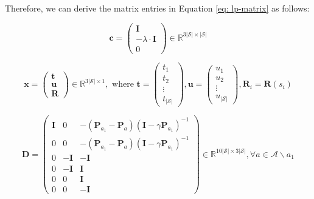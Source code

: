 Therefore, we can derive the matrix entries in Equation \ref{eq: lp-matrix} as follows:

\begin{equation}
\label{eq: c}
    \mathbf{c}=\left(\begin{array}{c}\mathbf{I} \\ -\lambda \cdot \mathbf{I} \\ 0\end{array}\right) \in \mathbb{R}^{3|\mathcal{S}| \times|\mathcal{S}|}
\end{equation}

\begin{equation}
\label{eq: x}
    \mathbf{x}=\left(\begin{array}{c}\mathbf{t} \\ \mathbf{u} \\ \mathbf{R}\end{array}\right) \in \mathbb{R}^{3|\mathcal{S}| \times 1}, \text { where } \mathbf{t}=\left(\begin{array}{c}t_{1} \\ t_{2} \\ \vdots \\ t_{|\mathcal{S}|}\end{array}\right), \mathbf{u}=\left(\begin{array}{c}u_{1} \\ u_{2} \\ \vdots \\ u_{|\mathcal{S}|}\end{array}\right), \mathbf{R}_{i}=\mathbf{R}\left(s_{i}\right)
\end{equation}

\begin{equation}
\label{eq: d}
    \mathbf{D}=\left(\begin{array}{ccc}\mathbf{I} & 0 & -\left(\mathbf{P}_{a_{1}}-\mathbf{P}_{a}\right)\left(\mathbf{I}-\gamma \mathbf{P}_{a_{1}}\right)^{-1} \\ 0 & 0 & -\left(\mathbf{P}_{a_{1}}-\mathbf{P}_{a}\right)\left(\mathbf{I}-\gamma \mathbf{P}_{a_{1}}\right)^{-1} \\ 0 & -\mathbf{I} & -\mathbf{I} \\ 0 & -\mathbf{I} & \mathbf{I} \\ 0 & 0 & \mathbf{I} \\ 0 & 0 & -\mathbf{I}\end{array}\right) \in \mathbb{R}^{10|\mathcal{S}| \times 3|\mathcal{S}|}, \forall a \in \mathcal{A} \backslash a_{1}
\end{equation}

